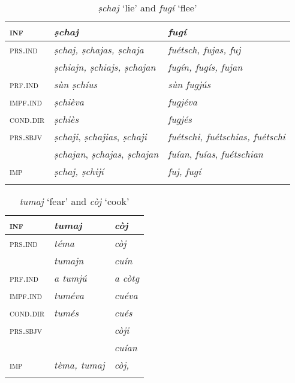 \begin{table}
	\caption{\textit{ṣchaj} `lie' and \textit{fugí} `flee'}
	\label{}
	\begin{tabular}{lll}
		\lsptoprule
		\textsc{inf} & \textbf{\textit{ṣchaj}} & \textbf{\textit{\textit{fugí}}}\\
		\midrule
		\textsc{prs.ind} & \textit{ṣchaj, ṣchajas, ṣchaja} & \textit{fuétsch, fujas, fuj}\\
		& \textit{ṣchiajn, ṣchiajs, ṣchajan} & \textit{fugín, fugís, fujan}\\
		\textsc{prf.ind} & \textit{sùn ṣchíus} & \textit{sùn fugjús}\\
		\textsc{impf.ind} & \textit{ṣchièva} & \textit{fugjéva}\\
		\textsc{cond.dir} & \textit{ṣchiès} & \textit{fugjés}\\
		\textsc{prs.sbjv} & \textit{ṣchaji}, \textit{ṣchajias}, \textit{ṣchaji} & \textit{fuétschi, fuétschias, fuétschi}\\
	&	\textit{ṣchajan}, \textit{ṣchajas}, \textit{ṣchajan} & \textit{fuían}, \textit{fuías}, \textit{fuétschian}\\
		\textsc{imp} & \textit{ṣchaj, ṣchijí} & \textit{fuj, fugí}\\
		\lspbottomrule
	\end{tabular}
\end{table}


\begin{table}
	\caption{\textit{tumaj} `fear'  and \textit{còj} `cook'}
	\label{}
	\begin{tabular}{lll}
		\lsptoprule
		\textsc{inf} & \textit{\textbf{tumaj}} & \textit{\textbf{còj}}\\
		\midrule
		\textsc{prs.ind} & \textit{téma} & \textit{còj} \\
		& \textit{tumajn} & \textit{cuín} \\
		\textsc{prf.ind} & \textit{a tumjú} & \textit{a còtg}\\
		\textsc{impf.ind} & \textit{tuméva} & \textit{cuéva}\\
		\textsc{cond.dir} & \textit{tumés} & \textit{cués}\\
		\textsc{prs.sbjv} & & \textit{còji}\\
		& & \textit{cuían}\\
		\textsc{imp} & \textit{tèma, tumaj} & \textit{còj, }\\
		\lspbottomrule
	\end{tabular}
\end{table}


